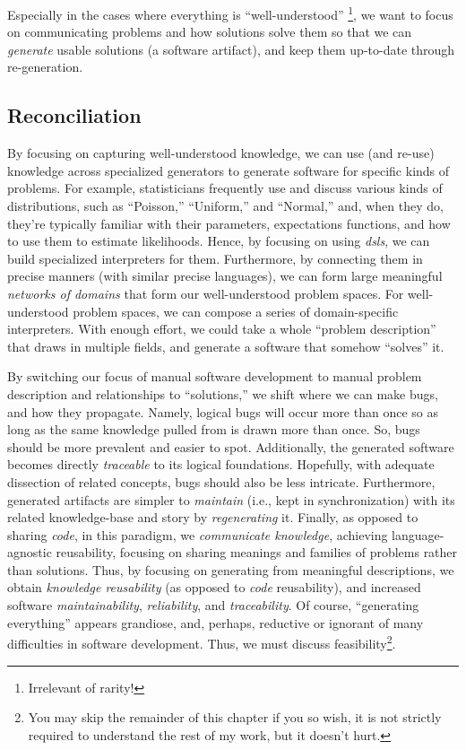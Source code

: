 Especially in the cases where everything is ``well-understood''
\cite{well-understood}\footnote{Irrelevant of rarity!}, we want to focus on
communicating problems and how solutions solve them so that we can
\textit{generate} usable solutions (a software artifact), and keep them
up-to-date through re-generation.

\subsection{Reconciliation}
\label{chap:ideology:sec:thoughts_of_generation:subsec:reconciliation}

By focusing on capturing well-understood \cite{well-understood} knowledge, we
can use (and re-use) knowledge across specialized generators to generate
software for specific kinds of problems. For example, statisticians frequently
use and discuss various kinds of distributions, such as ``Poisson,''
``Uniform,'' and ``Normal,'' and, when they do, they're typically familiar with
their parameters, expectations functions, and how to use them to estimate
likelihoods. Hence, by focusing on using \textit{\aclp{dsl}}, we can build
specialized interpreters for them. Furthermore, by connecting them in precise
manners (with similar precise languages), we can form large meaningful
\textit{networks of domains} \cite{Czarnecki2005} that form our well-understood
problem spaces. For well-understood problem spaces, we can compose a series of
domain-specific interpreters. With enough effort, we could take a whole
``problem description'' that draws in multiple fields, and generate a software
that somehow ``solves'' it.

By switching our focus of manual software development to manual problem
description and relationships to ``solutions,'' we shift where we can make bugs,
and how they propagate. Namely, logical bugs will occur more than once so as
long as the same knowledge pulled from is drawn more than once. So, bugs should
be more prevalent and easier to spot. Additionally, the generated software
becomes directly \textit{traceable} to its logical foundations. Hopefully, with
adequate dissection of related concepts, bugs should also be less intricate.
Furthermore, generated artifacts are simpler to \textit{maintain} (i.e., kept in
synchronization) with its related knowledge-base and story by
\textit{regenerating} it. Finally, as opposed to sharing \textit{code}, in this
paradigm, we \textit{communicate knowledge}, achieving language-agnostic
reusability, focusing on sharing meanings and families of problems rather than
solutions. Thus, by focusing on generating from meaningful descriptions, we
obtain \textit{knowledge reusability} (as opposed to \textit{code} reusability),
and increased software \textit{maintainability}, \textit{reliability}, and
\textit{traceability}. Of course, ``generating everything'' appears grandiose,
and, perhaps, reductive or ignorant of many difficulties in software
development. Thus, we must discuss feasibility\footnote{You may skip the
remainder of this chapter if you so wish, it is not strictly required to
understand the rest of my work, but it doesn't hurt.}.

